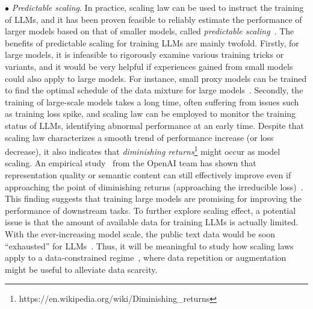 {
$\bullet$ \emph{Predictable scaling}. %
In practice, scaling law can be used to instruct the training of LLMs, and 
it has been proven   feasible to reliably estimate the performance of larger models based on that of smaller models,   called \emph{predictable scaling}~\cite{OpenAI-OpenAI-2023-GPT-4}. 
The benefits of predictable scaling for training LLMs are mainly twofold.  
Firstly, for large models, it is infeasible to rigorously examine various training tricks or variants, and it would be very  helpful if experiences gained from small models could also apply to large models. 
For instance, small proxy models can be trained to find the optimal schedule of the data mixture for large models~\cite{Xie-arxiv-2023-doremi}. 
Secondly, the training of large-scale models takes a long time,  often suffering from issues such as training loss spike, and scaling law can be employed to monitor the training status of LLMs, \eg identifying abnormal performance at an early time. Despite that scaling law characterizes a smooth trend of performance increase (or loss decrease), it also indicates that  \emph{diminishing returns}\footnote{https://en.wikipedia.org/wiki/Diminishing\_returns} might occur as model scaling. %
An empirical study~\cite{Henighan-2020-scalinglaw}  from the OpenAI team has shown that 
representation quality or semantic content can still effectively improve even if approaching the point of diminishing returns (\ie approaching the irreducible loss)~\cite{Henighan-2020-scalinglaw}. This finding suggests  that training large models are  promising for improving the  performance of downstream tasks. 
To further explore scaling effect, a potential issue is that the amount of available data for training LLMs is actually limited. With the ever-increasing model scale, the public text data would be soon ``exhausted'' for LLMs~\cite{Villalobos-arXiv-2023-runout}.  Thus, it will be meaningful to study how scaling laws apply to  a data-constrained regime~\cite{Muennighoff-arXiv-2023-dataconstrained}, where data  repetition or augmentation might be useful to alleviate data scarcity.   }    

